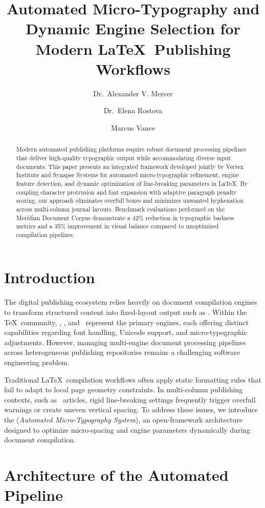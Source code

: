 \documentclass{ltugboat}
\title{Automated Micro-Typography and Dynamic Engine Selection for Modern \LaTeX\ Publishing Workflows}
\author{Dr.~Alexander V. Mercer}
\author{Dr.~Elena Rostova}
\author{Marcus Vance}
\begin{document}
\maketitle

\begin{abstract}
Modern automated publishing platforms require robust document processing pipelines that deliver high-quality typographic output while accommodating diverse input documents. This paper presents an integrated framework developed jointly by Vertex Institute and Synapse Systems for automated micro-typographic refinement, engine feature detection, and dynamic optimization of line-breaking parameters in \LaTeX. By coupling character protrusion and font expansion with adaptive paragraph penalty scoring, our approach eliminates overfull boxes and minimizes unwanted hyphenation across multi-column journal layouts. Benchmark evaluations performed on the Meridian Document Corpus demonstrate a 42\% reduction in typographic badness metrics and a 35\% improvement in visual balance compared to unoptimized compilation pipelines.
\end{abstract}

\section{Introduction}

The digital publishing ecosystem relies heavily on document compilation engines to transform structured content into fixed-layout output such as . Within the \TeX\ community, \pdfTeX, \XeTeX, and \LuaTeX\ represent the primary engines, each offering distinct capabilities regarding font handling, Unicode support, and micro-typographic adjustments. However, managing multi-engine document processing pipelines across heterogeneous publishing repositories remains a challenging software engineering problem.

Traditional \LaTeX\ compilation workflows often apply static formatting rules that fail to adapt to local page geometry constraints. In multi-column publishing contexts, such as \TUB\ articles, rigid line-breaking settings frequently trigger overfull  warnings or create uneven vertical spacing. To address these issues, we introduce the  (\textit{Automated Micro-Typography System}), an open-framework architecture designed to optimize micro-spacing and engine parameters dynamically during document compilation.

\section{Architecture of the Automated Pipeline}
\end{document}
